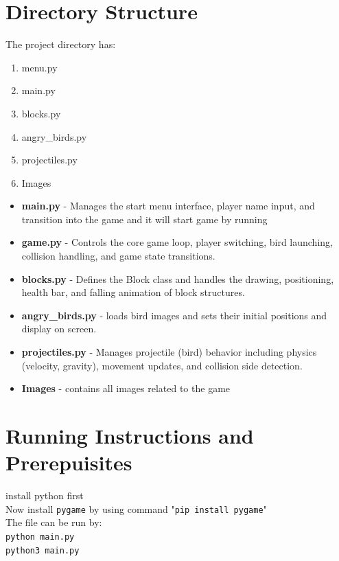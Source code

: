 \documentclass[10pt]{article}
\begin{document}
    \section{Directory Structure}
    The project directory has:

    \begin{enumerate}
        \item{menu.py}
        \item {main.py}
        \item {blocks.py}
        \item {angry\_birds.py}
        \item {projectiles.py}
        \item {Images}
    \end{enumerate}



    \begin{itemize}
        \item \textbf{main.py} - Manages the start menu interface, player name input, and transition into the game and it will start game by running 
        \item \textbf{game.py} - Controls the core game loop, player switching, bird launching, collision handling, and game state transitions.
        \item \textbf{blocks.py} - Defines the Block class and handles the drawing, positioning, health bar, and falling animation of block structures.
        \item \textbf{angry\_birds.py} - loads bird images and sets their initial positions and display on screen.
        \item \textbf{projectiles.py} - Manages projectile (bird) behavior including physics (velocity, gravity), movement updates, and collision side detection.
        \item \textbf{Images} - contains all images related to the game
    \end{itemize}


    \section{Running Instructions and Prerepuisites}

    install python first\\
    Now install \texttt{pygame} by using command 
    "\texttt{pip install pygame}"\\
    The file can be run by: \\
    \texttt{python main.py } \\
    \texttt{python3 main.py } \\
\end{document}
